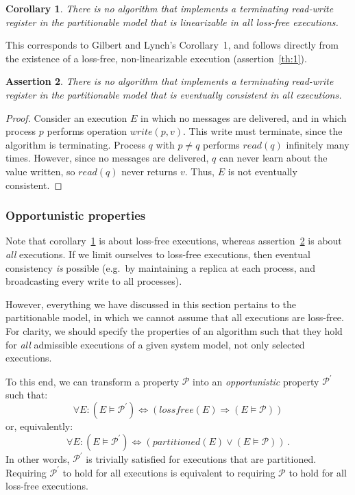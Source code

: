 \documentclass[a4paper,twocolumn,10pt]{article}
\newtheorem{theorem}{Assertion}
\newtheorem{corollary}[theorem]{Corollary}
\begin{document}
\begin{corollary}\label{corr:2}
There is no algorithm that implements a terminating read-write register in the partitionable model
that is linearizable in all loss-free executions.
\end{corollary}

This corresponds to Gilbert and Lynch's Corollary~1, and follows directly from the existence of a
loss-free, non-linearizable execution (assertion~\ref{th:1}).

\begin{theorem}\label{th:3}
There is no algorithm that implements a terminating read-write register in the partitionable model
that is eventually consistent in all executions.
\end{theorem}

\begin{proof}
Consider an execution $E$ in which no messages are delivered, and in which process $p$ performs
operation $\mathit{write}(p, v)$. This write must terminate, since the algorithm is terminating.
Process $q$ with $p \neq q$ performs $\mathit{read}(q)$ infinitely many times. However, since no
messages are delivered, $q$ can never learn about the value written, so $\mathit{read}(q)$ never
returns $v$. Thus, $E$ is not eventually consistent.
\end{proof}

\subsubsection{Opportunistic properties}

Note that corollary~\ref{corr:2} is about loss-free executions, whereas assertion~\ref{th:3} is
about \emph{all} executions. If we limit ourselves to loss-free executions, then eventual
consistency \emph{is} possible (e.g.\ by maintaining a replica at each process, and broadcasting
every write to all processes).

However, everything we have discussed in this section pertains to the partitionable model, in which
we cannot assume that all executions are loss-free. For clarity, we should specify the properties of
an algorithm such that they hold for \emph{all} admissible executions of a given system model, not
only selected executions.

To this end, we can transform a property $\mathcal{P}$ into an \emph{opportunistic} property
$\mathcal{P}^\prime$ such that:
$$\forall E \mathbin{:} (E \models \mathcal{P}^\prime) \Leftrightarrow (\mathit{lossfree}(E) \Rightarrow (E \models \mathcal{P}))$$
or, equivalently:
$$\forall E \mathbin{:} (E \models \mathcal{P}^\prime) \Leftrightarrow (\mathit{partitioned}(E) \vee (E \models \mathcal{P}))\,.$$
In other words, $\mathcal{P}^\prime$ is trivially satisfied for executions that are partitioned.
Requiring $\mathcal{P}^\prime$ to hold for all executions is equivalent to requiring $\mathcal{P}$
to hold for all loss-free executions.
\end{document}
